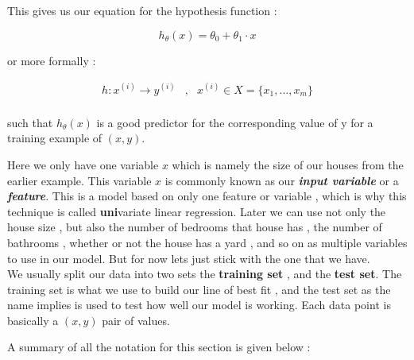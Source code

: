 This gives us our equation for the hypothesis function :

\[ h_{\theta}(x) = \theta_{0} + \theta_{1} \cdot x \tag{1} \]

or more formally :

\[
	\begin{aligned}
		h : x^{(i)} \rightarrow y^{(i)}
		& , &
		x^{(i)} \in X=\{x_1 , \ldots , x_m \}
		\\
	\end{aligned}
\]

such that \( h_{\theta}(x) \)  is a good predictor for the corresponding
value of y for a training example of \( (x,y) \).

Here we only have one variable \( x \) which is namely the size of our houses
from the earlier example. This variable \( x \) is commonly known as our
\textbf{\textit{input variable}} or a \textbf{\textit{feature}}. This is a model
based on only one feature or variable , which is why this technique is called
\textbf{uni}variate linear regression.  Later we can use not only the house size
, but also the number of bedrooms that house has , the number of bathrooms ,
whether or not the house has a yard , and so on as multiple variables to use in
our model. But for now lets just stick with the one that we have. \\

We usually split our data into two sets the \textbf {training set} , and the
\textbf {test set}. The training set is what we use to build our line of best
fit , and the test set as the name implies is used to test how well our model
is working. Each data point is basically a \( (x,y) \) pair of values. 

A summary of all the notation for this section is given below :



